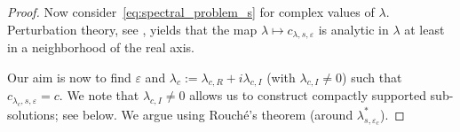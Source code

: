 \documentclass[11pt]{article}    %
\renewcommand{\epsilon}{\varepsilon}
\newcommand{\eps}{\varepsilon}
\begin{document}
\begin{proof}





Now consider~\eqref{eq:spectral_problem_s} for complex values of $\lambda$. Perturbation theory, see \cite[Chapter 7, \S 1, \S 2, \S 3]{Kato}, yields that the map $\lambda \mapsto c_{\lambda,s,\epsilon}$ is analytic in $\lambda$ at least in a neighborhood of the real axis.

Our aim is now to  find $\epsilon$ and $\lambda_c := \lambda_{c,R} + i \lambda_{c,I}$ (with $\lambda_{c,I} \neq 0$) such that $c_{\lambda_c,s,\epsilon} = c$.  We note that $\lambda_{c,I}\neq 0$ allows us to construct compactly supported sub-solutions; see below.  We argue using Rouché's theorem (around $\lambda_{s,\epsilon_c}^*$).  



\end{proof}
\end{document}
